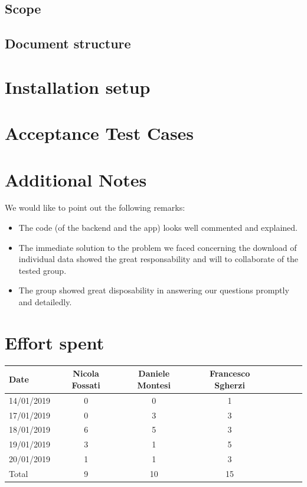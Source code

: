 \documentclass[a4paper,oneside,11pt]{article}
\begin{document}
        \subsection{Scope}
            
            
        \subsection{Document structure}
        

\newpage
    \section{Installation setup}
    
     
     
    
\newpage

    \section{Acceptance Test Cases}

    
    
    \section{Additional Notes}
    We would like to point out the following remarks: 
    
    \begin{itemize}
        \item The code (of the backend and the app) looks well commented and explained.
        \item The immediate solution to the problem we faced concerning the download of individual data showed the great responsability and will to collaborate of the tested group.
        \item The group showed great disposability in answering our questions promptly and detailedly.
    \end{itemize}
        
    \newpage
    \section{Effort spent}
        \begin{tabular}{l*{6}{c}r}
            Date & Nicola Fossati & Daniele Montesi & Francesco Sgherzi \\
            \hline
            14/01/2019 & 0 & 0 & 1   \\
            \hline
            17/01/2019 & 0 & 3 & 3   \\
            \hline
            18/01/2019 & 6 & 5 & 3   \\
            \hline
            19/01/2019 & 3 & 1 & 5   \\
             \hline
            20/01/2019 & 1 & 1 & 3   \\
            \hline
            Total & 9 & 10 & 15   \\
        \end{tabular}
\end{document}
